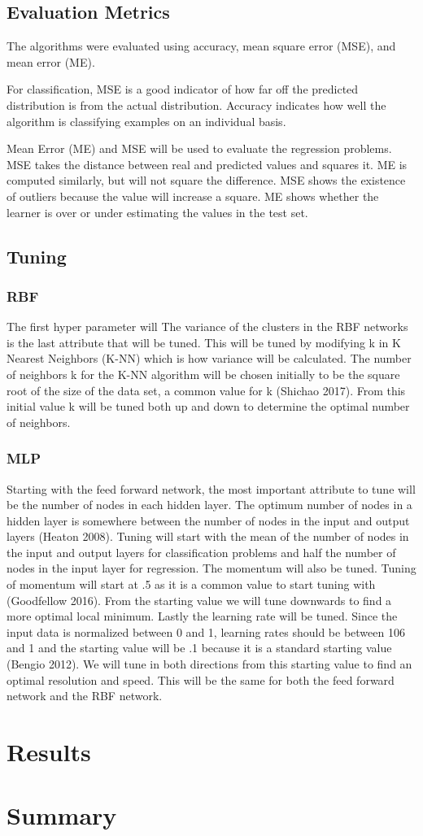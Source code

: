 \documentclass[twoside,11pt]{article}
\begin{document}
\subsection{Evaluation Metrics}
The algorithms were evaluated using accuracy, mean square error (MSE), and mean error (ME).

For classification, MSE is a good indicator of how far off the predicted distribution is from the actual distribution. Accuracy indicates how well the algorithm is classifying examples on an individual basis.

Mean Error (ME) and MSE will be used to evaluate the regression problems. MSE takes the distance between real and predicted values and squares it. ME is computed similarly, but will not square the difference. MSE shows the existence of outliers because the value will increase a square. ME shows whether the learner is over or under estimating the values in the test set.
\subsection{Tuning}
\subsubsection{RBF}
The first hyper parameter will 
The variance of the clusters in the RBF networks is the last attribute that will be tuned. This will be tuned by modifying k in K Nearest Neighbors (K-NN) which is how variance will be calculated. The number of  neighbors k for the K-NN algorithm will be chosen initially to be the square root of the size of the data set, a common value for k (Shichao 2017). From this initial value k will be tuned both up and down to determine the optimal number of neighbors.
\subsubsection{MLP}
Starting with the feed forward network, the most important attribute to tune will be the number of nodes in each hidden layer. The optimum number of nodes in a hidden layer is somewhere between the number of nodes in the input and output layers (Heaton 2008). Tuning will start with the mean of the number of nodes in the input and output layers for classification problems and half the number of nodes in the input layer for regression. The momentum will also be tuned. Tuning of momentum will start at .5 as it is a common value to start tuning with (Goodfellow 2016). From the starting value we will tune downwards to find a more optimal local minimum. Lastly the learning rate will be tuned. Since the input data is normalized between 0 and 1, learning rates should be between 106 and 1 and the starting value will be .1 because it is a standard starting value (Bengio 2012). We will tune in both directions from this starting value to find an optimal resolution and speed. This will be the same for both the feed forward network and the RBF network.

\section{Results}

\section{Summary}



\end{document}
